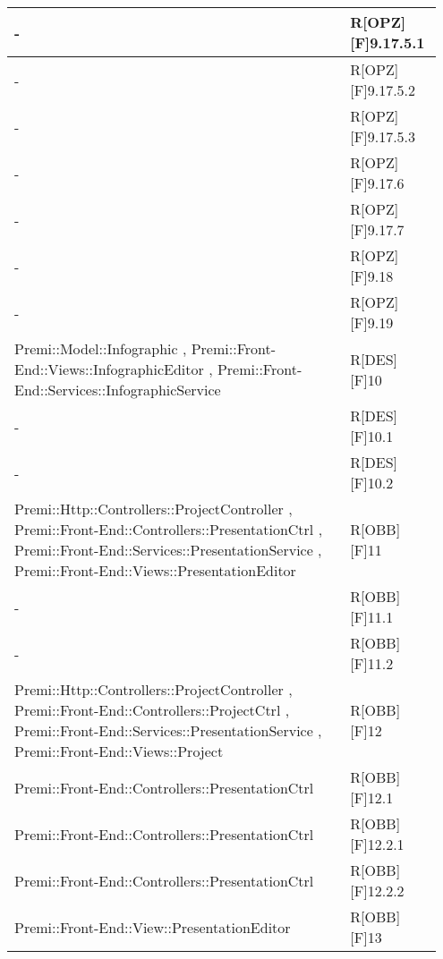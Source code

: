 \begin{table}[h]
	\begin{center}
		\begin{tabular}{|p{0.75\linewidth}|p{0.2\linewidth}|}
			\toprule
			- & R[OPZ][F]9.17.5.1 \\
		\midrule
			- & R[OPZ][F]9.17.5.2 \\
		\midrule
			- & R[OPZ][F]9.17.5.3 \\
		\midrule
			- & R[OPZ][F]9.17.6 \\
		\midrule
			- & R[OPZ][F]9.17.7 \\
		\midrule
			- & R[OPZ][F]9.18 \\
		\midrule
			- & R[OPZ][F]9.19 \\
		\midrule
			Premi::Model::Infographic , Premi::Front-End::Views::InfographicEditor , Premi::Front-End::Services::InfographicService & R[DES][F]10 \\
		\midrule
			- & R[DES][F]10.1 \\
		\midrule
			- & R[DES][F]10.2 \\
		\midrule
			Premi::Http::Controllers::ProjectController , Premi::Front-End::Controllers::PresentationCtrl , Premi::Front-End::Services::PresentationService , Premi::Front-End::Views::PresentationEditor & R[OBB][F]11 \\
		\midrule
			- & R[OBB][F]11.1 \\
		\midrule
			- & R[OBB][F]11.2 \\
		\midrule
			Premi::Http::Controllers::ProjectController , Premi::Front-End::Controllers::ProjectCtrl , Premi::Front-End::Services::PresentationService , Premi::Front-End::Views::Project & R[OBB][F]12 \\
		\midrule
			Premi::Front-End::Controllers::PresentationCtrl & R[OBB][F]12.1 \\
		\midrule
			Premi::Front-End::Controllers::PresentationCtrl & R[OBB][F]12.2.1 \\
		\midrule
			Premi::Front-End::Controllers::PresentationCtrl & R[OBB][F]12.2.2 \\
		\midrule
			Premi::Front-End::View::PresentationEditor & R[OBB][F]13 \\
			\bottomrule
		\end{tabular}
	\end{center}
\end{table}